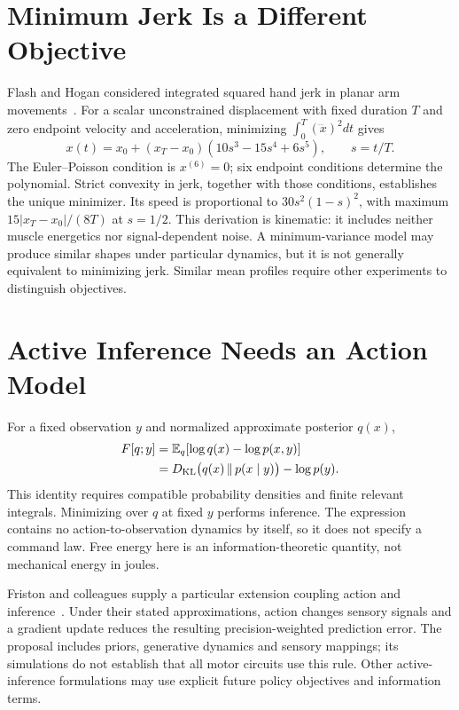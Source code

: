 \section{Minimum Jerk Is a Different Objective}

Flash and Hogan considered integrated squared hand jerk in planar arm
movements~\cite{FlashHogan1985}. For a scalar unconstrained displacement with
fixed duration $T$ and zero endpoint velocity and acceleration, minimizing
$\int_0^T(\dddot x)^2dt$ gives
\begin{equation}
 x(t)=x_0+(x_T-x_0)(10s^3-15s^4+6s^5),\qquad s=t/T.
\end{equation}
The Euler--Poisson condition is $x^{(6)}=0$; six endpoint conditions determine
the polynomial. Strict convexity in jerk, together with those conditions,
establishes the unique minimizer. Its speed is proportional to
$30s^2(1-s)^2$, with maximum $15|x_T-x_0|/(8T)$ at $s=1/2$.
This derivation is kinematic: it includes neither muscle energetics nor
signal-dependent noise. A minimum-variance model may produce similar shapes
under particular dynamics, but it is not generally equivalent to minimizing
jerk. Similar mean profiles require other experiments to distinguish objectives.

\section{Active Inference Needs an Action Model}

For a fixed observation $y$ and normalized approximate posterior $q(x)$,
\begin{align}
 F[q;y]&=\mathbb E_q[\log q(x)-\log p(x,y)]\\
       &=D_{\rm KL}\bigl(q(x)\,\|\,p(x\mid y)\bigr)-\log p(y).
 \label{eq:ch10:free-energy}
\end{align}
This identity requires compatible probability densities and finite relevant
integrals. Minimizing over $q$ at fixed $y$ performs inference. The expression
contains no action-to-observation dynamics by itself, so it does not specify
a command law. Free energy here is an information-theoretic quantity, not
mechanical energy in joules.

Friston and colleagues supply a particular extension coupling action and
inference~\cite{FristonAction2010Review}. Under their stated approximations,
action changes sensory signals and a gradient update reduces the resulting
precision-weighted prediction error. The proposal includes priors,
generative dynamics and sensory mappings; its simulations do not establish
that all motor circuits use this rule. Other active-inference formulations
may use explicit future policy objectives and information terms.

